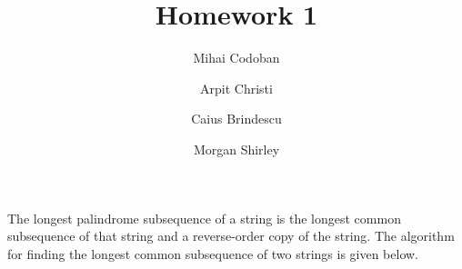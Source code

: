 \documentclass{article}
\title{Homework 1}
\author{Mihai Codoban \and Arpit Christi \and Caius Brindescu \and Morgan Shirley}
\begin{document}
\maketitle





The longest palindrome subsequence of a string is the longest common subsequence of that string and a reverse-order copy of the string. The algorithm for finding the longest common subsequence of two strings is given below.




\end{document}
